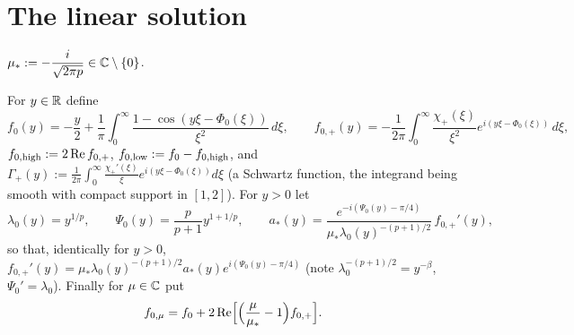 \section{The linear solution}

\begin{definition}
  \label{def:mu_star}
  $\mu_*:=-\dfrac{i}{\sqrt{2\pi p}}\in\mathbb{C}\setminus\{0\}$.
\end{definition}

\begin{definition}
  \label{def:c04_linear_seed}
  For $y\in\mathbb{R}$ define
  \begin{equation}\label{eqn:fixed_point_linear_solution}
    f_0(y)=-\frac y2+\frac1\pi\int_0^\infty\frac{1-\cos(y\xi-\Phi_0(\xi))}{\xi^2}\,d\xi,
    \qquad
    f_{0,+}(y)=-\frac1{2\pi}\int_0^\infty\frac{\chi_+(\xi)}{\xi^2}e^{i(y\xi-\Phi_0(\xi))}\,d\xi,
  \end{equation}
  $f_{0,\textup{high}}:=2\operatorname{Re}f_{0,+}$, $f_{0,\textup{low}}:=f_0-f_{0,\textup{high}}$, and
  $\Gamma_+(y):=\frac1{2\pi}\int_0^\infty\frac{\chi_+'(\xi)}{\xi}e^{i(y\xi-\Phi_0(\xi))}d\xi$ (a Schwartz function,
  the integrand being smooth with compact support in $[1,2]$). For $y>0$ let
  \[
    \lambda_0(y)=y^{1/p},\qquad \Psi_0(y)=\frac p{p+1}y^{1+1/p},\qquad
    a_*(y)=\frac{e^{-i(\Psi_0(y)-\pi/4)}}{\mu_*\lambda_0(y)^{-(p+1)/2}}\,f_{0,+}'(y),
  \]
  so that, identically for $y>0$,
  $f_{0,+}'(y)=\mu_*\lambda_0(y)^{-(p+1)/2}a_*(y)e^{i(\Psi_0(y)-\pi/4)}$ (note $\lambda_0^{-(p+1)/2}=y^{-\beta}$,
  $\Psi_0'=\lambda_0$). Finally for $\mu\in\mathbb{C}$ put
  \begin{equation}\label{eqn:approx_amplitude_seed}
    f_{0,\mu}=f_0+2\operatorname{Re}\Bigl[\Bigl(\frac\mu{\mu_*}-1\Bigr)f_{0,+}\Bigr].
  \end{equation}
\end{definition}

